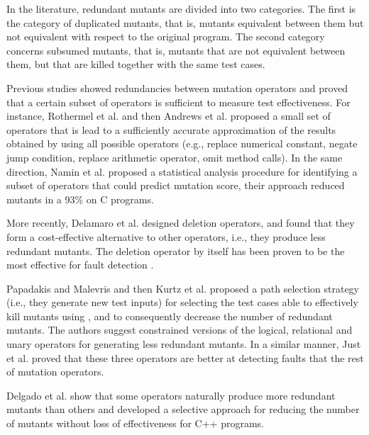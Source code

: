 In the literature, redundant mutants are divided into two categories. The first is the category of duplicated mutants, that is, mutants equivalent between them but not equivalent with respect to the original program. The second category concerns subsumed mutants, that is, mutants that are not equivalent between them, but that are killed together with the same test cases. 

Previous studies showed redundancies between mutation operators and proved that a certain subset of operators is sufficient to measure test effectiveness. For instance, Rothermel et al. \cite{rothermel1996experimental} and then Andrews et al. \cite{andrews2005mutation} proposed a small set of operators that is lead to a sufficiently accurate approximation of the results obtained by using all possible operators (e.g., replace numerical constant, negate jump condition, replace arithmetic operator, omit method calls). In the same direction, Namin et al. \cite{siami2008sufficient} proposed a statistical analysis procedure for identifying a subset of operators that could predict mutation score, their approach reduced mutants in a 93\% on C programs. 

More recently, Delamaro et al. \cite{delamaro2014designing} designed deletion operators, and found that they form a cost-effective alternative to other operators, i.e., they produce less redundant mutants. The deletion operator by itself has been proven to be the most effective for fault detection \cite{delamaro2014designing}.

Papadakis and Malevris \cite{papadakis2012mutation} and then Kurtz et al. \cite{kurtz2015static} proposed a path selection strategy (i.e., they generate new test inputs) for selecting the test cases able to effectively kill mutants using , and to consequently decrease the number of redundant mutants. 
The authors suggest constrained versions of the logical, relational and unary operators for generating less redundant mutants. 
In a similar manner, Just et al. \cite{just2012redundant,just2015higher} proved that these three operators are better at detecting faults that the rest of mutation operators.

Delgado et al. \cite{delgado2017assessment} show that some operators naturally produce more redundant mutants than others and
developed a selective approach for reducing the number of mutants without loss of effectiveness for C++ programs. 

